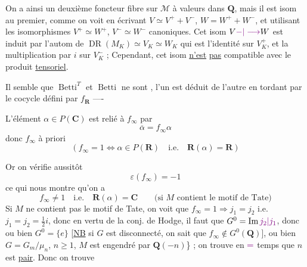 On a ainsi un deuxième foncteur fibre sur $\mathcal M$ à valeurs dans $\mathbf Q$, mais il est isom  au premier,  comme on voit en écrivant $V\simeq V^++V^-$, $W=W^++W^-$, et utilisant les isomorphismes $V^+\simeq W^+$, $V^-\simeq W^-$ canoniques. Cet isom $V\unsure{-|\longrightarrow}W$ est  induit par l'autom de $\operatorname{DR}(M_K)\simeq V_K\simeq W_K$ qui est l'identité sur $V_K^+$, et la multiplication par $i$ sur $V_K^-$ ; Cependant, cet isom \uline{n'est} \uline{pas} compatible avec le produit \uline{tensoriel}.

Il semble que $\operatorname{Betti}^T$ et $\operatorname{Betti}$ ne sont , l'un est déduit de l'autre en tordant par le cocycle défini par $f_{\mathbf R}$ ----

L'élément $\alpha\in P(\mathbf C)$ est relié à $f_\infty$ par
\[
\overline\alpha=f_\infty\alpha
\]
donc $f_\infty$ à priori
\[
\left(f_\infty=1\Longleftrightarrow\alpha\in P(\mathbf R)\quad\text{i.e.}\quad\mathbf R(\alpha)=\mathbf R\right)
\]

Or on vérifie aussitôt
\[
\boxed{\varepsilon(f_\infty)=-1}
\]
ce qui nous montre qu'on a 
\[
\boxed{f_\infty\ne1\quad\text{i.e.}\quad\mathbf R(\alpha)=\mathbf C}
\qquad\text{(si $M$ contient le motif de Tate)}
\]
Si $M$ ne contient pas le motif de Tate, on voit que $f_\infty=1\Longrightarrow j_1=j_2$ i.e. $j_1=j_2=\frac12 i$, donc en vertu de la conj. de Hodge, il faut que $G^0=\operatorname{Im}\unsure{j_2|j_1}$, donc ou bien $G^0=\{e\}$    [\uline{NB} si $G$ est disconnecté, on sait que $f_\infty\notin G^0(\mathbf Q)$], ou bien $G=G_m/\mu_n$, $n\geq1$, $M$ est  engendré par $\mathbf Q(-n)$\} ; on trouve en $\unsure{=}$ temps que $n$ est \uline{pair}. Donc on trouve


